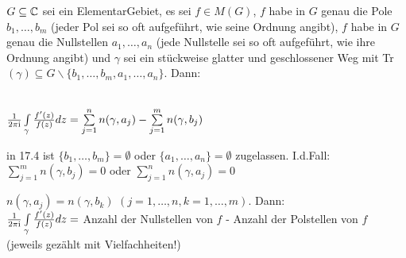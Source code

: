 \documentclass[a4paper,twoside,DIV15,BCOR12mm]{scrbook}
\def\wegint{\ensuremath{\int\limits_\gamma}}
\def\ie{\rm i}
\begin{document}
\begin{satz} 
  $G \subseteq \mathbb{C}$ sei ein ElementarGebiet, es sei $f \in M(G)$, $f$ habe in $G$ genau die
  Pole $b_1, \ldots, b_m$ (jeder Pol sei so oft aufgef\"uhrt, wie seine Ordnung
  angibt), $f$ habe in $G$ genau die Nullstellen $a_1, \ldots , a_n$ (jede
  Nullstelle sei so oft aufgef\"uhrt, wie ihre Ordnung angibt) und $\gamma$ sei ein
  st\"uckweise glatter und geschlossener Weg mit Tr$(\gamma) \subseteq G \backslash
  \{b_1, \ldots, b_m, a_1, \ldots, a_n\}$. Dann: \\ \\
  \centerline{$\frac{1}{2 \pi \ie} \wegint \frac{f'(z)}{f(z)} dz =
  \sum\limits_{j=1}^{n} n(\gamma, a_j) - \sum\limits_{j=1}^{m} n(\gamma, b_j)$}
\end{satz}

\begin{bemerkung}
  \begin{liste}
    \item in 17.4 ist $\{b_1,\ldots, b_m\} = \emptyset$ oder $\{a_1,\ldots, a_n\} =
    \emptyset$ zugelassen. I.d.Fall: $ \sum\limits_{j=1}^{m} n(\gamma, b_j) = 0$ oder
    $\sum\limits_{j=1}^{n} n(\gamma, a_j) = 0$
    \item $n(\gamma, a_j) =  n(\gamma, b_k)$ $(j=1,\dots,n, k = 1,\dots,m)$. Dann: \\
    $\frac{1}{2 \pi \ie} \wegint \frac{f'(z)}{f(z)} dz = $ Anzahl der Nullstellen
    von $f$ - Anzahl der Polstellen von $f$ (jeweils gez\"ahlt mit Vielfachheiten!)
  \end{liste}
\end{bemerkung}
\end{document}
